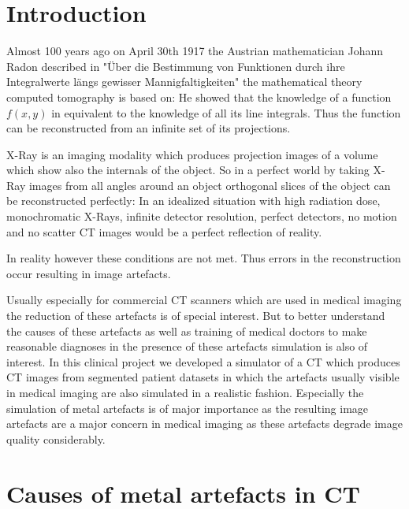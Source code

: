 \chapter{Introduction}
\label{intro}
\par Almost 100 years ago on April 30th 1917 the Austrian mathematician Johann Radon described in "\"Uber die Bestimmung von Funktionen durch ihre Integralwerte l\"angs gewisser Mannigfaltigkeiten" the mathematical theory computed tomography is based on: He showed that the knowledge of a function \(f(x,y)\) in equivalent to the knowledge of all its line integrals. Thus the function can be reconstructed from an infinite set of its projections.\cite{Radon}
\par X-Ray is an imaging modality which produces projection images of a volume which show also the internals of the object. So in a perfect world by taking X-Ray images from all angles around an object orthogonal slices of the object can be reconstructed perfectly: In an idealized situation with high radiation dose, monochromatic X-Rays, infinite detector resolution, perfect detectors, no motion and no scatter CT images would be a perfect reflection of reality.\cite{CausesAndReductionTechniques}
\par In reality however these conditions are not met. Thus errors in the reconstruction occur resulting in image artefacts.
\par Usually especially for commercial CT scanners which are used in medical imaging the reduction of these artefacts is of special interest. But to better understand the causes of these artefacts as well as training of medical doctors to make reasonable diagnoses in the presence of these artefacts simulation is also of interest. In this clinical project we developed a simulator of a CT which produces CT images from segmented patient datasets in which the artefacts usually visible in medical imaging are also simulated in a realistic fashion. Especially the simulation of metal artefacts is of major importance as the resulting image artefacts are a major concern in medical imaging as these artefacts degrade image quality considerably.

\chapter{Causes of metal artefacts in CT}
